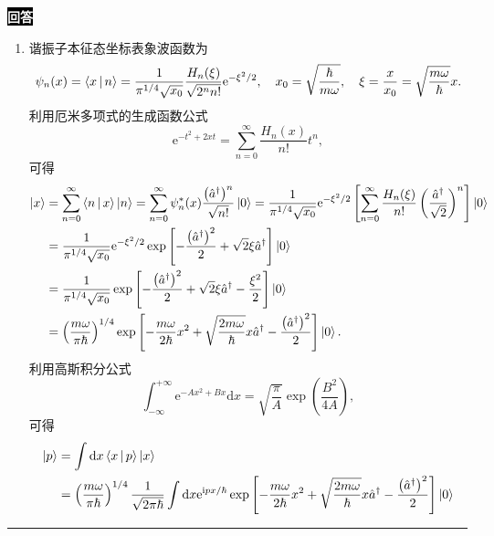 \documentclass[11pt,a4paper]{ctexart}
\newenvironment{answer}
  {\par\smallskip\noindent
   \begingroup
   \setlength{\fboxsep}{4pt}%
   \colorbox{black}{\textcolor{white}{\bfseries 回答}}%
   \endgroup
   \quad\ignorespaces}
  {\par\smallskip\noindent\rule{\linewidth}{0.4pt}\medskip}
\begin{document}
\begin{answer}
  \begin{enumerate}
    \item 谐振子本征态坐标表象波函数为
    \begin{equation}
      \psi_n(x)
      =\Braket{x|n }
      =\frac{1 }{\pi^{1/4} \sqrt{x_0} } \frac{H_n(\xi) }{\sqrt{2^n n!} } \mathrm{e}^{-\xi^2/2},\quad 
      x_0 = \sqrt{\frac{\hbar }{m\omega } },\quad
      \xi = \frac{x }{x_0 } = \sqrt{\frac{m\omega }{\hbar } } x.
    \end{equation}
    利用厄米多项式的生成函数公式
    \begin{equation}
      \mathrm{e}^{-t^2+2xt} = \sum_{n=0}^{\infty} \frac{H_n(x) }{n! } t^n,
    \end{equation}
    可得
    \begin{equation}
      \begin{aligned}
        \Ket{x }
        &=\sum_{n=0}^{\infty} \Braket{n|x } \Ket{n }
        =\sum_{n=0}^{\infty} \psi_n^*(x) \frac{\left(\hat{a}^\dag \right)^n }{\sqrt{n!} } \Ket{0 }
        =\frac{1 }{\pi^{1/4} \sqrt{x_0} } \mathrm{e}^{-\xi^2/2} \left[\sum_{n=0}^{\infty} \frac{H_n(\xi) }{n! } \left(\frac{\hat{a}^\dag }{\sqrt{2} }  \right)^n  \right] \Ket{0 } \\
        &=\frac{1 }{\pi^{1/4} \sqrt{x_0} } \mathrm{e}^{-\xi^2/2} \exp\left[-\frac{\left(\hat{a}^\dag \right)^2  }{2 } + \sqrt{2} \xi \hat{a}^\dag \right] \Ket{0 } \\
        &=\frac{1 }{\pi^{1/4} \sqrt{x_0} } \exp\left[-\frac{\left(\hat{a}^\dag \right)^2  }{2 } + \sqrt{2} \xi \hat{a}^\dag - \frac{\xi^2 }{2 }  \right] \Ket{0 } \\
        &=\left(\frac{m\omega}{\pi\hbar}\right)^{1/4}\exp\left[-\frac{m\omega}{2\hbar}x^2+\sqrt{\frac{2m\omega}{\hbar}}x\hat a^\dagger-\frac{\left(\hat a^\dagger\right)^2}{2}\right]\Ket{0}.
      \end{aligned}
    \end{equation}
    利用高斯积分公式
    \begin{equation}
      \int_{-\infty}^{+\infty} \mathrm{e}^{-Ax^2+Bx} \mathrm{d}x
      =\sqrt{\frac{\pi }{A } } \exp\left(\frac{B^2 }{4A }  \right),
    \end{equation}
    可得
    \begin{equation}
      \begin{aligned}
        \Ket{p }
        &=\int \mathrm{d}x \Braket{x|p } \Ket{x } \\
        &=\left(\frac{m\omega}{\pi\hbar}\right)^{1/4} \frac{1 }{\sqrt{2\pi\hbar} } \int\mathrm{d}x \mathrm{e}^{\mathrm{i}px/\hbar} \exp\left[-\frac{m\omega}{2\hbar}x^2+\sqrt{\frac{2m\omega}{\hbar}}x\hat a^\dagger-\frac{\left(\hat a^\dagger\right)^2}{2}\right] \Ket{0 } \\

\end{aligned}
\end{equation}
\end{enumerate}
\end{answer}
\end{document}
